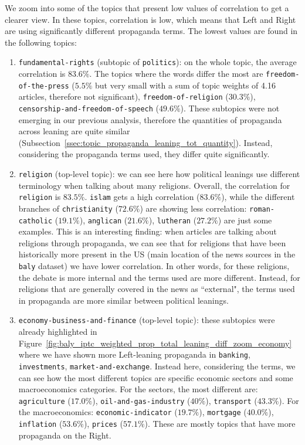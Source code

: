 We zoom into some of the topics that present low values of correlation to get a clearer view. In these topics, correlation is low, which means that Left and Right are using significantly different propaganda terms.
The lowest values are found in the following topics:

\begin{enumerate}
    \item \texttt{fundamental-rights} (subtopic of \texttt{politics}): on the whole topic, the average correlation is $83.6\%$. The topics where the words differ the most are \texttt{freedom-of-the-press} ($5.5\%$ but very small with a sum of topic weights of 4.16 articles, therefore not significant), \texttt{freedom-of-religion} ($30.3\%$), \texttt{censorship-and-freedom-of-speech} ($49.6\%$). These subtopics were not emerging in our previous analysis, therefore the quantities of propaganda across leaning are quite similar (Subsection~\ref{ssec:topic_propaganda_leaning_tot_quantity}). Instead, considering the propaganda terms used, they differ quite significantly.
    \item \texttt{religion} (top-level topic): we can see here how political leanings use different terminology when talking about many religions. Overall, the correlation for \texttt{religion} is $83.5\%$. \texttt{islam} gets a high correlation ($83.6\%$), while the different branches of \texttt{christianity} ($72.6\%$) are showing less correlation: \texttt{roman-catholic} ($19.1\%$), \texttt{anglican} ($21.6\%$), \texttt{lutheran} ($27.2\%$) are just some examples. This is an interesting finding: when articles are talking about religions through propaganda, we can see that for religions that have been historically more present in the US (main location of the news sources in the \texttt{baly} dataset) we have lower correlation. In other words, for these religions, the debate is more internal and the terms used are more different. Instead, for religions that are generally covered in the news as ``external", the terms used in propaganda are more similar between political leanings.
    \item \texttt{economy-business-and-finance} (top-level topic): these subtopics were already highlighted in Figure~\ref{fig:baly_iptc_weighted_prop_total_leaning_diff_zoom_economy} where we have shown more Left-leaning propaganda in \texttt{banking}, \texttt{investments}, \texttt{market-and-exchange}. Instead here, considering the terms, we can see how the most different topics are specific economic sectors and some macroeconomics categories. For the sectors, the most different are: \texttt{agriculture} ($17.0\%$), \texttt{oil-and-gas-industry} ($40\%$), \texttt{transport} ($43.3\%$). For the macroeconomics: \texttt{economic-indicator} ($19.7\%$), \texttt{mortgage} ($40.0\%$), \texttt{inflation} ($53.6\%$), \texttt{prices} ($57.1\%$). These are mostly topics that have more propaganda on the Right.

\end{enumerate}
